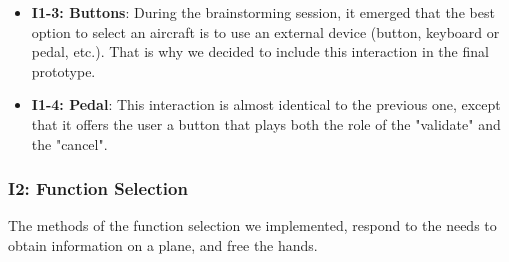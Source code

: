 \begin{itemize}
\item \textbf{I1-3: Buttons}: During the brainstorming session, it emerged that the best
option to select an aircraft is to use an external device
(button, keyboard or pedal, etc.). That is why we decided to
include this interaction in the final prototype.

\item \textbf{I1-4: Pedal}: This interaction is almost identical to the previous one, except that it offers the user a button that plays both the role of the "validate" and the "cancel".

\end{itemize}


\subsubsection{I2: Function Selection}
The methods of the function selection we implemented,
respond to the needs to obtain information on a plane, and
free the hands.
 
